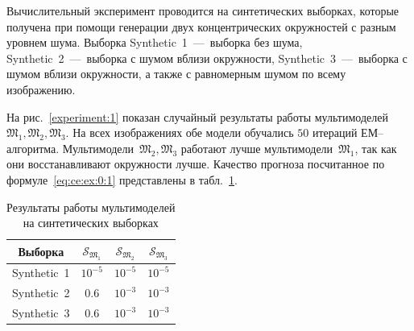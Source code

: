 \documentclass[12pt, twoside]{article}
\numberwithin{equation}{section}
\begin{document}
Вычислительный эксперимент проводится на синтетических выборках, которые получена при помощи генерации двух концентрических окружностей с разным уровнем шума. Выборка Synthetic~1~---~выборка без шума, Synthetic~2~---~выборка с шумом вблизи окружности, Synthetic~3~---~выборка с шумом вблизи окружности, а также с равномерным шумом по всему изображению.


На рис.~\ref{experiment:1} показан случайный результаты работы мультимоделей~$\mathfrak{M}_1, \mathfrak{M}_2, \mathfrak{M}_3$. На всех изображениях обе модели обучались $50$ итераций ЕМ--алгоритма. Мультимодели~$\mathfrak{M}_2, \mathfrak{M}_3$ работают лучше мультимодели~$\mathfrak{M}_1$, так как они восстанавливают окружности лучше. Качество прогноза посчитанное по формуле~\eqref{eq:ce:ex:0:1} представлены в табл.~\ref{tb:ce:1}.

\begin{table}[h!t]
\begin{center}
\caption{Результаты работы мультимоделей на синтетических выборках}
\label{tb:ce:1}
\begin{tabular}{|c|c|c|c|}
\hline
	Выборка & $\mathcal{S}_{\mathfrak{M}_1}$ & $\mathcal{S}_{\mathfrak{M}_2} $& $\mathcal{S}_{\mathfrak{M}_3} $\\
	\hline
	\multicolumn{1}{|l|}{Synthetic~1}
	& $10^{-5}$& $10^{-5}$& $10^{-5}$\\
	\hline
	\multicolumn{1}{|l|}{Synthetic~2}
	& $0.6$& $10^{-3}$& $10^{-3}$\\
	\hline
	\multicolumn{1}{|l|}{Synthetic~3}
	& $0.6$& $10^{-3}$& $10^{-3}$\\
\hline
\end{tabular}
\end{center}
\end{table}


\end{document}
